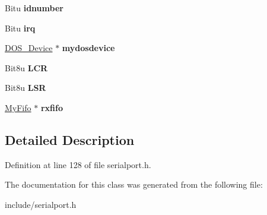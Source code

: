 \begin{DoxyCompactItemize}
\item 
\hypertarget{classCSerial_a8c544ffae840bf00e8185eee2b176ccc}{Bitu {\bfseries idnumber}}\label{classCSerial_a8c544ffae840bf00e8185eee2b176ccc}

\item 
\hypertarget{classCSerial_ac7142618a6f82ffd683cc1a8936fb5eb}{Bitu {\bfseries irq}}\label{classCSerial_ac7142618a6f82ffd683cc1a8936fb5eb}

\item 
\hypertarget{classCSerial_a805edbbeb60acbbb3d06defa286bd8fb}{\hyperlink{classDOS__Device}{D\-O\-S\-\_\-\-Device} $\ast$ {\bfseries mydosdevice}}\label{classCSerial_a805edbbeb60acbbb3d06defa286bd8fb}

\item 
\hypertarget{classCSerial_a5eec4c91bdf04199a3eef2b9c5526762}{Bit8u {\bfseries L\-C\-R}}\label{classCSerial_a5eec4c91bdf04199a3eef2b9c5526762}

\item 
\hypertarget{classCSerial_ab3d298a5b33f7761db6a684fd8d4e941}{Bit8u {\bfseries L\-S\-R}}\label{classCSerial_ab3d298a5b33f7761db6a684fd8d4e941}

\item 
\hypertarget{classCSerial_a590948bc816f7502390abbb3e5c10bc7}{\hyperlink{classMyFifo}{My\-Fifo} $\ast$ {\bfseries rxfifo}}\label{classCSerial_a590948bc816f7502390abbb3e5c10bc7}

\end{DoxyCompactItemize}


\subsection{Detailed Description}


Definition at line 128 of file serialport.\-h.



The documentation for this class was generated from the following file\-:\begin{DoxyCompactItemize}
\item 
include/serialport.\-h\end{DoxyCompactItemize}
